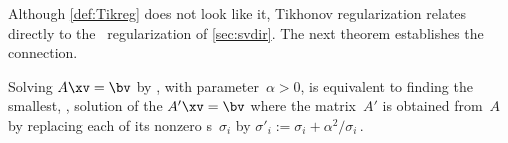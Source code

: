 Although \cref{def:Tikreg} does not look like it, Tikhonov regularization relates directly to the \svd\ regularization of \cref{sec:svdir}.
The next theorem establishes the connection.



\begin{theorem} \label{thm:Tikreg}
Solving \(A\xv=\bv\) by , with parameter~\(\alpha>0\), is equivalent to finding the smallest, , solution of the  \(A'\xv=\bv\) where  
the matrix~\(A'\) is obtained from~\(A\) by replacing each of its nonzero s~\(\sigma_i\) by \(\sigma'_i:=\sigma_i+\alpha^2/\sigma_i\)\,.
\end{theorem}

